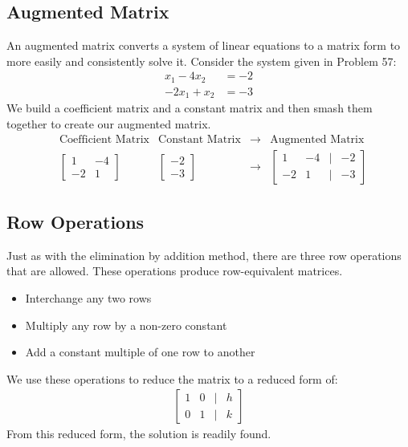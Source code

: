 \documentclass[14pt]{extarticle}
\begin{document}
\subsection*{Augmented Matrix}
An augmented matrix converts a system of linear equations to a matrix form to more easily and consistently solve it. Consider the system given in Problem 57:
\begin{align*}
	x_1 - 4x_2 &= -2 \\
	-2x_1 + x_2 &= -3
\end{align*}
We build a coefficient matrix and a constant matrix and then smash them together to create our augmented matrix.
\begin{align*}
	&\text{Coefficient Matrix} &\text{Constant Matrix} & \to &\text{Augmented Matrix} \\
	&\begin{bmatrix}
		1 & -4 \\
		-2 & 1
	\end{bmatrix} 
	&\begin{bmatrix}
		-2 \\
		-3
	\end{bmatrix}
	& \to &\begin{bmatrix}
		1 & -4 & | & -2\\
		-2 & 1 & | & -3
	\end{bmatrix}
\end{align*}

\subsection*{Row Operations}
Just as with the elimination by addition method, there are three row operations that are allowed. These operations produce row-equivalent matrices.
\begin{itemize}
	\item Interchange any two rows
	\item Multiply any row by a non-zero constant
	\item Add a constant multiple of one row to another
\end{itemize}
We use these operations to reduce the matrix to a reduced form of:
\begin{align*}
	\begin{bmatrix}
		1 & 0 & | & h \\
		0 & 1 & | & k
	\end{bmatrix}
\end{align*}
From this reduced form, the solution is readily found.
\end{document}
